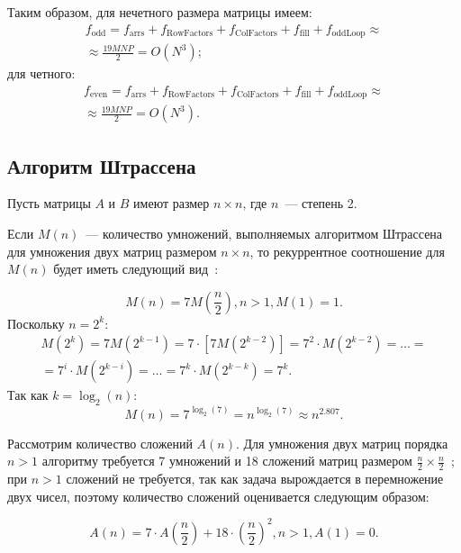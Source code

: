 Таким образом, для нечетного размера матрицы имеем:
\begin{multline}
    f_\text{odd} = f_\text{arrs} + f_\text{RowFactors} + f_\text{ColFactors} + f_\text{fill} + f_\text{oddLoop} \approx \\ \approx \frac{19MNP}{2} = O(N^3);
\end{multline}
для четного:
\begin{multline}
    f_\text{even} = f_\text{arrs} + f_\text{RowFactors} + f_\text{ColFactors} + f_\text{fill} + f_\text{oddLoop} \approx \\ \approx \frac{19MNP}{2} = O(N^3).
\end{multline}

\subsection{Алгоритм Штрассена}

Пусть матрицы $A$ и $B$ имеют размер $n \times n$, где $n$~--- степень 2.

Если $M(n)$~---  количество умножений, выполняемых алгоритмом Штрассена для умножения двух матриц размером $n \times n$, то рекуррентное соотношение для $M(n)$ будет иметь следующий вид~\cite{strassen-elib}:

\begin{equation}
    M(n) = 7M \left (\frac{n}{2} \right ), n > 1, M(1) = 1.
\end{equation}
Поскольку $n = 2^k$:
\begin{equation}
    \begin{gathered}
        M(2^k) = 7M(2^{k - 1}) = 7 \cdot [7M(2^{k - 2})] = 7^2 \cdot M(2^{k-2}) = \ldots = \\
        = 7^i \cdot M(2^{k-i}) = \ldots = 7^k \cdot M(2^{k-k}) = 7^k.
    \end{gathered}
\end{equation}
Так как $k = \log_2{(n)}$:
\begin{equation}
    M(n) = 7^{\log_2{(7)}} = n^{\log_2{(7)}} \approx n^{2.807}.
\end{equation}

Рассмотрим количество сложений $A(n)$.
Для умножения двух матриц порядка $n > 1$ алгоритму требуется 7 умножений и 18 сложений матриц размером $\frac{n}{2} \times \frac{n}{2}$~\cite{strassen-elib}; при $n > 1$ сложений не требуется, так как задача вырождается в перемножение двух чисел, поэтому количество сложений оценивается следующим образом:

\begin{equation}
    A(n) = 7 \cdot A \left ( \frac{n}{2} \right ) + 18 \cdot \left ( \frac{n}{2} \right )^2, n > 1, A(1) = 0.
\end{equation}


